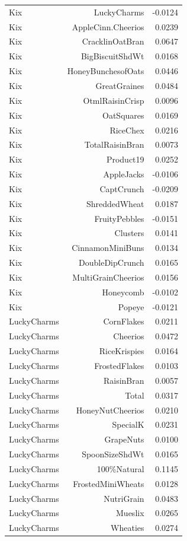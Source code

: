 \begin{longtable}{@{}lrr@{}}
Kix & LuckyCharms & -0.0124 \\
Kix & AppleCinn.Cheerios & 0.0239 \\
Kix & CracklinOatBran & 0.0647 \\
Kix & BigBiscuitShdWt & 0.0168 \\
Kix & HoneyBunchesofOats & 0.0446 \\
Kix & GreatGraines & 0.0484 \\
Kix & OtmlRaisinCrisp & 0.0096 \\
Kix & OatSquares & 0.0169 \\
Kix & RiceChex & 0.0216 \\
Kix & TotalRaisinBran & 0.0073 \\
Kix & Product19 & 0.0252 \\
Kix & AppleJacks & -0.0106 \\
Kix & CaptCrunch & -0.0209 \\
Kix & ShreddedWheat & 0.0187 \\
Kix & FruityPebbles & -0.0151 \\
Kix & Clusters & 0.0141 \\
Kix & CinnamonMiniBuns & 0.0134 \\
Kix & DoubleDipCrunch & 0.0165 \\
Kix & MultiGrainCheerios & 0.0156 \\
Kix & Honeycomb & -0.0102 \\
Kix & Popeye & -0.0121 \\
LuckyCharms & CornFlakes & 0.0211 \\
LuckyCharms & Cheerios & 0.0472 \\
LuckyCharms & RiceKrispies & 0.0164 \\
LuckyCharms & FrostedFlakes & 0.0103 \\
LuckyCharms & RaisinBran & 0.0057 \\
LuckyCharms & Total & 0.0317 \\
LuckyCharms & HoneyNutCheerios & 0.0210 \\
LuckyCharms & SpecialK & 0.0231 \\
LuckyCharms & GrapeNuts & 0.0100 \\
LuckyCharms & SpoonSizeShdWt & 0.0165 \\
LuckyCharms & 100\%Natural & 0.1145 \\
LuckyCharms & FrostedMiniWheats & 0.0128 \\
LuckyCharms & NutriGrain & 0.0483 \\
LuckyCharms & Mueslix & 0.0265 \\
LuckyCharms & Wheaties & 0.0274 \\

\end{longtable}

